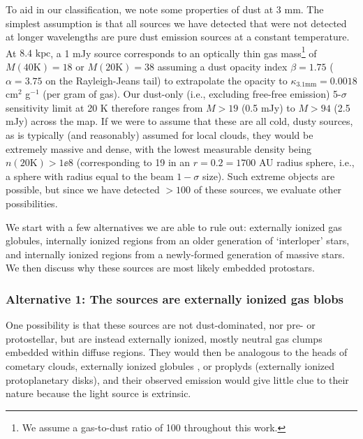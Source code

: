 \documentclass[twocolumn]{aastex61}
\newcommand{\dsgrb}{\ensuremath{8.4\textrm{~kpc}}\xspace}
\begin{document}
To aid in our classification, we note some properties of dust at 3 mm.  The
simplest assumption is that all sources we have detected that were not detected
at longer wavelengths are pure dust emission sources at a constant temperature.
At \dsgrb, a 1 mJy source corresponds to an optically thin gas mass\footnote{We
assume a gas-to-dust ratio of 100 throughout this work.} of
$M(40\mathrm{K})=18$ \msun or $M(20\mathrm{K})=38$ \msun assuming a dust
opacity index $\beta=1.75$ ($\alpha=3.75$ on the Rayleigh-Jeans tail) to
extrapolate the \citet[][MRN with thin ice mantles anchored at
1mm]{Ossenkopf1994a} opacity to $\kappa_{3.1 \mathrm{mm}}=0.0018$ cm$^2$
g$^{-1}$ (per gram of gas).  Our dust-only (i.e., excluding free-free emission)
5-$\sigma$ sensitivity limit at 20 K therefore ranges from $M>19$ \msun (0.5
mJy) to $M>94$ \msun (2.5 mJy) across the map.  If we were to assume that these
are all cold, dusty sources, as is typically (and reasonably) assumed for local
clouds, they would be extremely massive and dense, with the lowest measurable
density being $n(20\mathrm{K}) > 1\ee{8}$ \percc (corresponding to 19 \msun in
an $r=0.2$\arcsec$=1700$ AU radius sphere, i.e., a sphere with radius equal
to the beam $1-\sigma$ size).  Such extreme objects are possible,
but since we have detected $>100$ of these sources, we evaluate other
possibilities.

We start with a few alternatives we are able to rule out: externally
ionized gas globules, internally ionized \hii regions from an older
generation of `interloper' stars, and internally ionized \hii regions
from a newly-formed generation of massive stars.  We then discuss
why these sources are most likely embedded protostars.


\subsubsection{Alternative 1: The sources are externally ionized gas blobs}
\label{sec:alt1}
One possibility is that these sources are not dust-dominated, nor pre- or
protostellar, but are instead externally ionized, mostly neutral gas clumps
embedded within diffuse \hii regions.  They would then be analogous to the
heads of cometary clouds, externally ionized globules
\citep[``EGGs"][]{Sahai2012a}, or proplyds (externally ionized protoplanetary
disks), and their observed emission would give little clue to their nature because
the light source is extrinsic.
\end{document}
